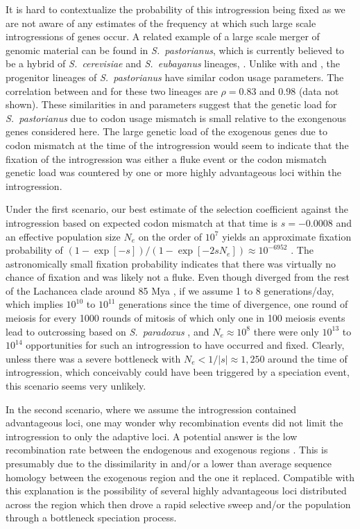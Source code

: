 \documentclass[fleqn,letterpaper]{article}
\begin{document}
It is hard to contextualize the probability of this introgression being fixed as we are not aware of any estimates of the frequency at which such large scale introgressions of genes occur.
A related example of a large scale merger of genomic material can be found in \emph{S.~pastorianus}, which is currently believed to be a hybrid of \emph{S.~cerevisiae} and \emph{S.~eubayanus} lineages, \citep{baker2015}.
Unlike with \kluyveri and \gossypii, the  progenitor lineages of \emph{S.~pastorianus} have similar codon usage parameters.
The correlation between \DM and \DE for these two lineages are  $\rho = 0.83$ and  $0.98$ (data not shown).
These similarities in \DM and \DE parameters suggest that the genetic load for \emph{S.~pastorianus} due to codon usage mismatch is small relative to the exongenous genes considered here. 
The large genetic load of the exogenous genes due to codon mismatch at the time of the introgression would seem to indicate that the fixation of the introgression was either a fluke event or the codon mismatch genetic load was countered by one or more highly advantageous loci within the introgression.

Under the first scenario, our best estimate of the selection coefficient against the introgression based on expected codon mismatch at that time is $s = -0.0008$ and an effective population size $N_e$ on the order of $10^7$ \citep{wagner2005} yields an approximate fixation probability of $(1-\exp[- s])/(1-\exp[-2sN_e]) \approx 10^{-6952}$ \citep{SellaAndHirsh2005}.
The astronomically small fixation probability indicates that there was virtually no chance of fixation and was likely not a fluke.
Even though \kluyveri diverged from the rest of the Lachancea clade around 85 Mya \citep{kensche2008, MHM2015}, if we assume 1 to 8 generations/day, which implies $10^{10}$ to $10^{11}$ generations since the time of divergence, one round of meiosis for every 1000 rounds of mitosis of which only one in 100 meiosis events lead to outcrossing based on \emph{S.~paradoxus} \citep{tsai2008}, and $N_e \approx 10^8$ there were only $10^{13}$ to $10^{14}$ opportunities for such an introgression to have occurred and fixed.
Clearly, unless there was a severe bottleneck with $N_e < 1/|s| \approx 1,250$ around the time of introgression, which conceivably could have been triggered by a speciation event, this scenario seems very unlikely.

In the second scenario, where we assume the introgression contained advantageous loci, one may wonder why recombination events did not limit the introgression to only the adaptive loci.
A potential answer is the low recombination rate between the endogenous and exogenous regions \citet{payen2009, brion2017} .
This is presumably due to the dissimilarity in \GC and/or a lower than average sequence homology between the exogenous region and the one it replaced.
Compatible with this explanation is the possibility of several highly advantageous loci distributed across the region which then drove a rapid selective sweep and/or the population through a bottleneck speciation process.
\end{document}
